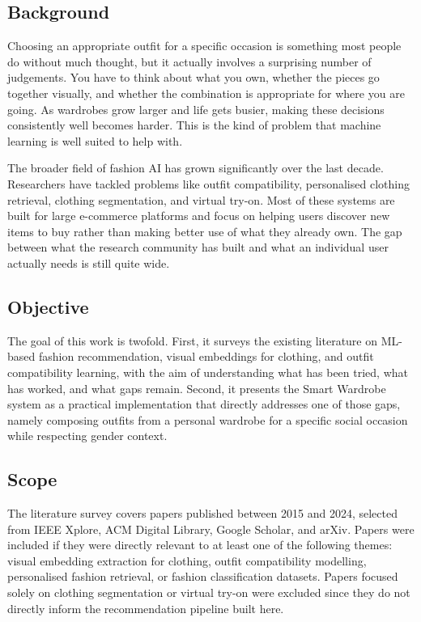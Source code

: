 \documentclass[conference]{IEEEtran}
\begin{document}
\subsection{Background}

Choosing an appropriate outfit for a specific occasion is something most people do without much thought, but it actually involves a surprising number of judgements. You have to think about what you own, whether the pieces go together visually, and whether the combination is appropriate for where you are going. As wardrobes grow larger and life gets busier, making these decisions consistently well becomes harder. This is the kind of problem that machine learning is well suited to help with.

The broader field of fashion AI has grown significantly over the last decade. Researchers have tackled problems like outfit compatibility, personalised clothing retrieval, clothing segmentation, and virtual try-on. Most of these systems are built for large e-commerce platforms and focus on helping users discover new items to buy rather than making better use of what they already own. The gap between what the research community has built and what an individual user actually needs is still quite wide.

\subsection{Objective}

The goal of this work is twofold. First, it surveys the existing literature on ML-based fashion recommendation, visual embeddings for clothing, and outfit compatibility learning, with the aim of understanding what has been tried, what has worked, and what gaps remain. Second, it presents the Smart Wardrobe system as a practical implementation that directly addresses one of those gaps, namely composing outfits from a personal wardrobe for a specific social occasion while respecting gender context.

\subsection{Scope}

The literature survey covers papers published between 2015 and 2024, selected from IEEE Xplore, ACM Digital Library, Google Scholar, and arXiv. Papers were included if they were directly relevant to at least one of the following themes: visual embedding extraction for clothing, outfit compatibility modelling, personalised fashion retrieval, or fashion classification datasets. Papers focused solely on clothing segmentation or virtual try-on were excluded since they do not directly inform the recommendation pipeline built here.
\end{document}
